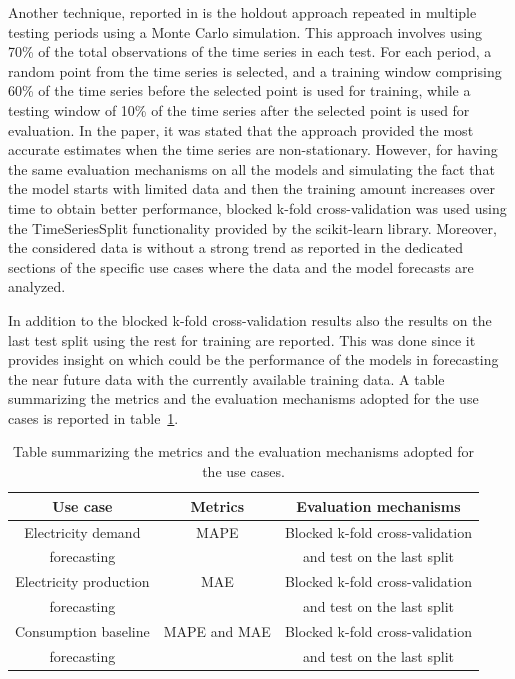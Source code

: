 Another technique, reported in \cite{Cerqueira2020} is the holdout approach repeated in multiple testing periods using a Monte Carlo simulation.
This approach involves using 70\% of the total observations of the time series in each test.
For each period, a random point from the time series is selected, and a training window comprising 60\% of the time series before the selected point is used for training, while a testing window of 10\% of the time series after the selected point is used for evaluation.
In the paper, it was stated that the approach provided the most accurate estimates when the time series are non-stationary.
However, for having the same evaluation mechanisms on all the models and simulating the fact that the model starts with limited data and then the training amount increases over time to obtain better performance, blocked k-fold cross-validation was used using the TimeSeriesSplit functionality provided by the scikit-learn library.
Moreover, the considered data is without a strong trend as reported in the dedicated sections of the specific use cases where the data and the model forecasts are analyzed.

In addition to the blocked k-fold cross-validation results also the results on the last test split using the rest for training are reported.
This was done since it provides insight on which could be the performance of the models in forecasting the near future data with the currently available training data.
A table summarizing the metrics and the evaluation mechanisms adopted for the use cases is reported in table~\ref{tab:metricstable}.

\begin{table}[H]
\centering
\begin{tabular}{|c|c|c|}
\hline
\textbf{Use case} & \textbf{Metrics} & \textbf{Evaluation mechanisms}\\
\hline
Electricity demand & MAPE & Blocked k-fold cross-validation\\
forecasting & & and test on the last split\\
\hline
Electricity production & MAE & Blocked k-fold cross-validation\\
forecasting & & and test on the last split\\
\hline
Consumption baseline & MAPE and MAE & Blocked k-fold cross-validation\\
forecasting & & and test on the last split\\
\hline
\end{tabular}
\caption{Table summarizing the metrics and the evaluation mechanisms adopted for the use cases.}
\label{tab:metricstable}
\end{table}

